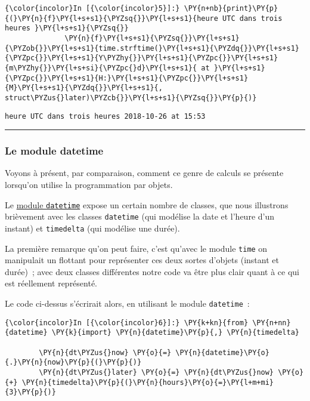     \begin{Verbatim}[commandchars=\\\{\}]
{\color{incolor}In [{\color{incolor}5}]:} \PY{n+nb}{print}\PY{p}{(}\PY{n}{f}\PY{l+s+s1}{\PYZsq{}}\PY{l+s+s1}{heure UTC dans trois heures }\PY{l+s+s1}{\PYZsq{}}
              \PY{n}{f}\PY{l+s+s1}{\PYZsq{}}\PY{l+s+s1}{\PYZob{}}\PY{l+s+s1}{time.strftime(}\PY{l+s+s1}{\PYZdq{}}\PY{l+s+s1}{\PYZpc{}}\PY{l+s+s1}{Y\PYZhy{}}\PY{l+s+s1}{\PYZpc{}}\PY{l+s+s1}{m\PYZhy{}}\PY{l+s+si}{\PYZpc{}d}\PY{l+s+s1}{ at }\PY{l+s+s1}{\PYZpc{}}\PY{l+s+s1}{H:}\PY{l+s+s1}{\PYZpc{}}\PY{l+s+s1}{M}\PY{l+s+s1}{\PYZdq{}}\PY{l+s+s1}{, struct\PYZus{}later)\PYZcb{}}\PY{l+s+s1}{\PYZsq{}}\PY{p}{)}
\end{Verbatim}


    \begin{Verbatim}[commandchars=\\\{\}]
heure UTC dans trois heures 2018-10-26 at 15:53

    \end{Verbatim}

    \begin{center}\rule{0.5\linewidth}{\linethickness}\end{center}

    \hypertarget{le-module-datetime}{%
\subsubsection{Le module datetime}\label{le-module-datetime}}

    Voyons à présent, par comparaison, comment ce genre de calculs se
présente lorsqu'on utilise la programmation par objets.

Le \href{https://docs.python.org/3/library/datetime.html}{module
\texttt{datetime}} expose un certain nombre de classes, que nous
illustrons brièvement avec les classes \texttt{datetime} (qui modélise
la date et l'heure d'un instant) et \texttt{timedelta} (qui modélise une
durée).

La première remarque qu'on peut faire, c'est qu'avec le module
\texttt{time} on manipulait un flottant pour représenter ces deux sortes
d'objets (instant et durée)~; avec deux classes différentes notre code
va être plus clair quant à ce qui est réellement représenté.

    Le code ci-dessus s'écrirait alors, en utilisant le module
\texttt{datetime}~:

    \begin{Verbatim}[commandchars=\\\{\}]
{\color{incolor}In [{\color{incolor}6}]:} \PY{k+kn}{from} \PY{n+nn}{datetime} \PY{k}{import} \PY{n}{datetime}\PY{p}{,} \PY{n}{timedelta}
        
        \PY{n}{dt\PYZus{}now} \PY{o}{=} \PY{n}{datetime}\PY{o}{.}\PY{n}{now}\PY{p}{(}\PY{p}{)}
        \PY{n}{dt\PYZus{}later} \PY{o}{=} \PY{n}{dt\PYZus{}now} \PY{o}{+} \PY{n}{timedelta}\PY{p}{(}\PY{n}{hours}\PY{o}{=}\PY{l+m+mi}{3}\PY{p}{)}
\end{Verbatim}


